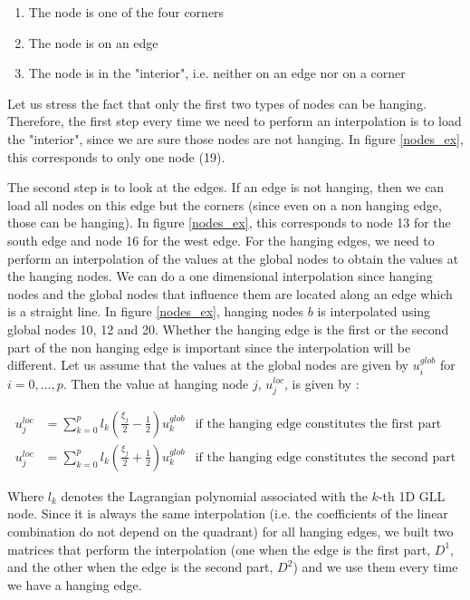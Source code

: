 \begin{enumerate}
\item The node is one of the four corners
\item The node is on an edge
\item The node is in the "interior", i.e. neither on an edge nor on a corner
\end{enumerate}

Let us stress the fact that only the first two types of nodes can be hanging. Therefore, the first step every time we need to perform an interpolation is to load the "interior", since we are sure those nodes are not hanging. In figure \ref{nodes_ex}, this corresponds to only one node (19).

The second step is to look at the edges. If an edge is not hanging, then we can load all nodes on this edge but the corners (since even on a non hanging edge, those can be hanging). In figure \ref{nodes_ex}, this corresponds to node 13 for the south edge and node 16 for the west edge. For the hanging edges, we need to perform an interpolation of the values at the global nodes to obtain the values at the hanging nodes. We can do a one dimensional interpolation since hanging nodes and the global nodes that influence them are located along an edge which is a straight line. In figure \ref{nodes_ex}, hanging nodes $b$ is interpolated using global nodes 10, 12 and 20.  Whether the hanging edge is the first or the second part of the non hanging edge is important since the interpolation will be different. Let us assume that the values at the global nodes are given by $u^{glob}_i$ for $i=0,...,p$. Then the value at hanging node $j$, $u^{loc}_j$, is given by : 

\begin{align*}
u^{loc}_j &= \sum_{k=0}^p l_k\left(\frac{\xi_j}{2}-\frac{1}{2}\right) u_k^{glob} &\text{if the hanging edge constitutes the first part}\\
u^{loc}_j &= \sum_{k=0}^p l_k\left(\frac{\xi_j}{2}+\frac{1}{2}\right) u_k^{glob} &\text{if the hanging edge constitutes the second part}
\end{align*}

Where $l_k$ denotes the Lagrangian polynomial associated with the $k$-th 1D GLL node. Since it is always the same interpolation (i.e. the coefficients of the linear combination do not depend on the quadrant) for all hanging edges, we built two matrices that perform the interpolation (one when the edge is the first part, $D^1$, and the other when the edge is the second part, $D^2$) and we use them every time we have a hanging edge. 

